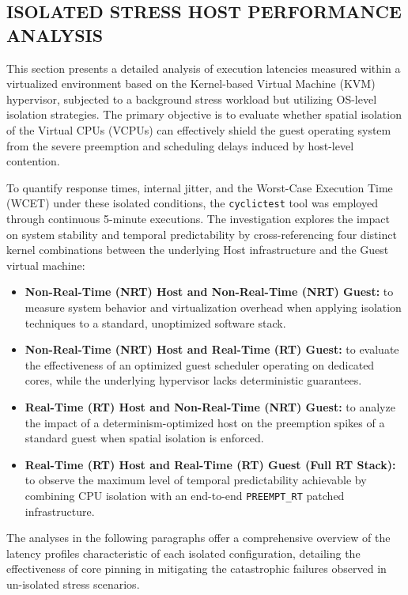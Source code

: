 \subsection{ISOLATED STRESS HOST PERFORMANCE
ANALYSIS}\label{isolated-stress-host-performance-analysis}

This section presents a detailed analysis of execution latencies
measured within a virtualized environment based on the Kernel-based
Virtual Machine (KVM) hypervisor, subjected to a background stress
workload but utilizing OS-level isolation strategies. The primary
objective is to evaluate whether spatial isolation of the Virtual CPUs
(VCPUs) can effectively shield the guest operating system from the
severe preemption and scheduling delays induced by host-level
contention.

To quantify response times, internal jitter, and the Worst-Case
Execution Time (WCET) under these isolated conditions, the
\texttt{cyclictest} tool was employed through continuous 5-minute
executions. The investigation explores the impact on system stability
and temporal predictability by cross-referencing four distinct kernel
combinations between the underlying Host infrastructure and the Guest
virtual machine:

\begin{itemize}
\item
  \textbf{Non-Real-Time (NRT) Host and Non-Real-Time (NRT) Guest:} to
  measure system behavior and virtualization overhead when applying
  isolation techniques to a standard, unoptimized software stack.
\item
  \textbf{Non-Real-Time (NRT) Host and Real-Time (RT) Guest:} to
  evaluate the effectiveness of an optimized guest scheduler operating
  on dedicated cores, while the underlying hypervisor lacks
  deterministic guarantees.
\item
  \textbf{Real-Time (RT) Host and Non-Real-Time (NRT) Guest:} to analyze
  the impact of a determinism-optimized host on the preemption spikes of
  a standard guest when spatial isolation is enforced.
\item
  \textbf{Real-Time (RT) Host and Real-Time (RT) Guest (Full RT Stack):}
  to observe the maximum level of temporal predictability achievable by
  combining CPU isolation with an end-to-end \texttt{PREEMPT\_RT}
  patched infrastructure.
\end{itemize}

The analyses in the following paragraphs offer a comprehensive overview
of the latency profiles characteristic of each isolated configuration,
detailing the effectiveness of core pinning in mitigating the
catastrophic failures observed in un-isolated stress scenarios.

